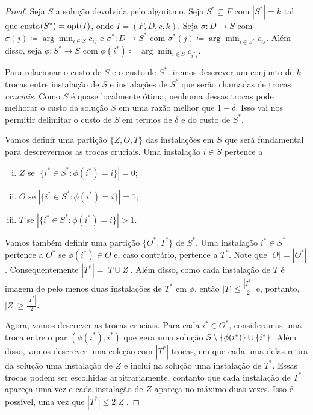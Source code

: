 \begin{proof}
Seja $S$ a solução devolvida pelo algoritmo. Seja $S^* \subseteq F$ com $|S^*| = k$ tal que custo$(S^*) = \mathrm{opt}(I)$, onde $I = (F,D,c,k)$. Seja ${\sigma : D \rightarrow S}$ com ${\sigma(j) \coloneqq \arg\min_{i \in S} c_{ij}}$ e ${\sigma^* : D \rightarrow S^*}$ com ${\sigma^*(j) \coloneqq \arg\min_{i\in S^*} c_{ij}}$.
Além disso, seja $\phi:S^* \rightarrow S$ com $\phi(i^*) \coloneqq \arg\min_{i \in S} c_{i^*i}$.

Para relacionar o custo de $S$ e o custo de $S^*$, iremos descrever um conjunto de $k$ trocas entre instalação de $S$ e instalações de $S^*$ que serão chamadas de trocas \emph{cruciais}. Como $S$ é quase localmente ótima, nenhuma dessas trocas pode melhorar o custo da solução $S$ em uma razão melhor que $ 1- \delta$. Isso vai nos permitir delimitar o custo de $S$ em termos de $\delta$ e do custo de $S^*$.

Vamos definir uma partição $\{Z,O,T\}$ das instalações em $S$ que será fundamental para descrevermos as trocas cruciais. Uma instalação $i \in S$ pertence a 
\begin{enumerate}[i.]
\item $Z$ se $|\{i^* \in S^* : \phi(i^*) = i\}| = 0$;
\item $O$ se $|\{i^* \in S^* : \phi(i^*) = i\}| = 1$;
\item $T$ se $|\{i^* \in S^* : \phi(i^*) = i\}| > 1$.
\end{enumerate}
Vamos também definir uma partição $\{O^*,T^*\}$ de $S^*$. Uma instalação $i^* \in S^*$ pertence a $O^*$ se $\phi(i^*) \in O$ e, caso contrário, pertence a $T^*$. Note que $|O| = |O^*|$. Consequentemente $|T^*| = |T\cup Z|$. Além disso, como cada instalação de $T$ é imagem de pelo menos duas instalações de $T^*$ em $\phi$, então $|T| \leq \frac{|T^*|}{2}$ e, portanto, $|Z| \geq \frac{|T^*|}{2}$.

Agora, vamos descrever as trocas cruciais. Para cada $i^* \in O^*$, consideramos uma troca entre o par $(\phi(i^*),i^*)$ que gera uma solução $S\setminus \{\phi(i^*)\} \cup \{i^*\}$. Além disso, vamos descrever uma coleção com $|T^*|$ trocas, em que cada uma delas retira da solução uma instalação de $Z$ e inclui na solução uma instalação de $T^*$. Essas trocas podem ser escolhidas arbitrariamente, contanto que cada instalação de $T^*$ apareça uma vez e cada instalação de $Z$ apareça no máximo duas vezes. Isso é possível, uma vez que $|T^*| \leq 2 |Z|$.


\end{proof}
